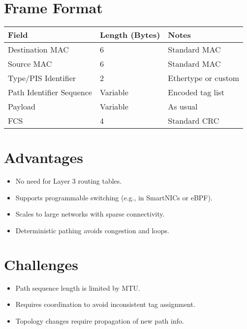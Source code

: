 \documentclass[../../../OAE-SPEC-MAIN.tex]{subfiles}
\begin{document}
\section{Frame Format}

\vspace{6pt}
\begin{tabular}{@{}lll@{}}
\toprule
\textbf{Field}             & \textbf{Length (Bytes)} & \textbf{Notes} \\
\midrule
Destination MAC           & 6                      & Standard MAC \\
Source MAC                & 6                      & Standard MAC \\
Type/PIS Identifier       & 2                      & Ethertype or custom \\
Path Identifier Sequence  & Variable               & Encoded tag list \\
Payload                   & Variable               & As usual \\
FCS                       & 4                      & Standard CRC \\
\bottomrule
\end{tabular}
\vspace{12pt}

\section{Advantages}

\begin{itemize}
    \item No need for Layer 3 routing tables.
    \item Supports programmable switching (e.g., in SmartNICs or eBPF).
    \item Scales to large networks with sparse connectivity.
    \item Deterministic pathing avoids congestion and loops.
\end{itemize}

\section{Challenges}

\begin{itemize}
    \item Path sequence length is limited by MTU.
    \item Requires coordination to avoid inconsistent tag assignment.
    \item Topology changes require propagation of new path info.
\end{itemize}
\end{document}
